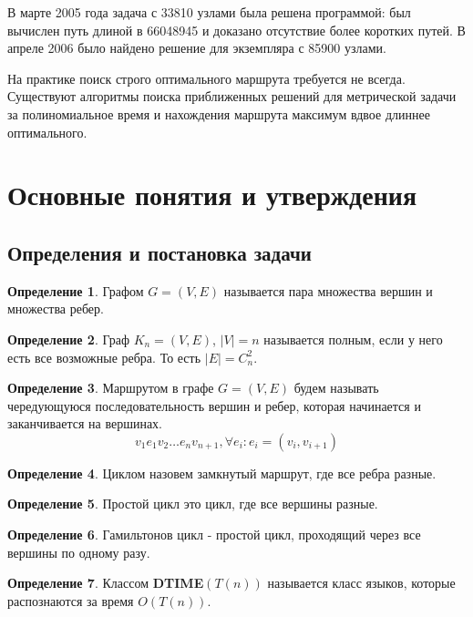 \documentclass[a4paper,12pt]{article}
\theoremstyle{plain}
\theoremstyle{definition}
\newtheorem{definition}{Определение}[section]
\theoremstyle{remark}
\begin{document}
В марте 2005 года задача с 33810 узлами была решена программой: был вычислен путь длиной в 66048945 и доказано отсутствие более коротких путей. В апреле 2006 было найдено решение для экземпляра с 85900 узлами.

На практике поиск строго оптимального маршрута требуется не всегда. Существуют алгоритмы поиска приближенных решений для метрической задачи за полиномиальное время и нахождения маршрута максимум вдвое длиннее оптимального.
\section{Основные понятия и утверждения}

\subsection{Определения и постановка задачи}
\begin{definition}
    Графом $G = \left(V, E\right)$ называется пара множества вершин и множества ребер.
\end{definition}

\begin{definition}
    Граф $K_n = \left(V, E\right)$, $\left|V\right| = n$ называется полным, если у него есть все возможные ребра. То есть $\left|E\right| = C_n^2$.
\end{definition}

\begin{definition}
    Маршрутом в графе $G = \left(V, E\right)$ будем называть чередующуюся последовательность вершин и ребер, которая начинается и заканчивается на вершинах.
    $$
        v_1e_1v_2\ldots e_nv_{n+1}, \forall e_i: e_i=\left(v_i, v_{i+1}\right)
    $$
\end{definition}

\begin{definition}
    Циклом назовем замкнутый маршрут, где все ребра разные.
\end{definition}

\begin{definition}
    Простой цикл это цикл, где все вершины разные.
\end{definition}

\begin{definition}
    Гамильтонов цикл - простой цикл, проходящий через все вершины по одному разу.
\end{definition}

\begin{definition}
    Классом \textbf{DTIME}$\left(T(n)\right)$ называется класс языков, которые распознаются за время $O(T(n))$.
\end{definition}
\end{document}

